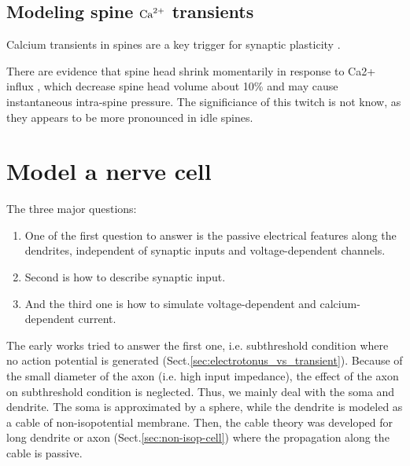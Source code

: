 

\subsection{Modeling spine ${\text{Ca}^{2+}}$ transients}
\label{sec:spine-model-with-Ca-transient}

Calcium transients in spines are a key trigger for synaptic plasticity
\citep{nevian2006}.


There are evidence that spine head shrink momentarily in response to Ca2+ influx
\citep{korkotian2001}, which decrease spine head volume about 10\% and may cause
instantaneous intra-spine pressure. The significiance of this twitch is not
know, as they appears to be more pronounced in idle spines.

\section{Model a nerve cell}
\label{sec:model-cell}

The three major questions:
\begin{enumerate}
  \item One of the first question to answer is the passive electrical features along the
dendrites, independent of synaptic inputs and voltage-dependent channels.
  \item Second is how to describe synaptic input. 
  \item And the third one is how to
  simulate voltage-dependent and calcium-dependent current. 
\end{enumerate}

The early works tried to answer the first one, i.e. subthreshold condition where
no action potential is generated (Sect.\ref{sec:electrotonus_vs_transient}).
Because of the small diameter of the axon (i.e. high input impedance), the
effect of the axon on subthreshold condition is neglected. Thus, we mainly deal
with the soma and dendrite. The soma is approximated by a sphere, while the
dendrite is modeled as a cable of non-isopotential membrane. Then, the cable
theory was developed for long dendrite or axon (Sect.\ref{sec:non-isop-cell})
where the propagation along the cable is passive.




